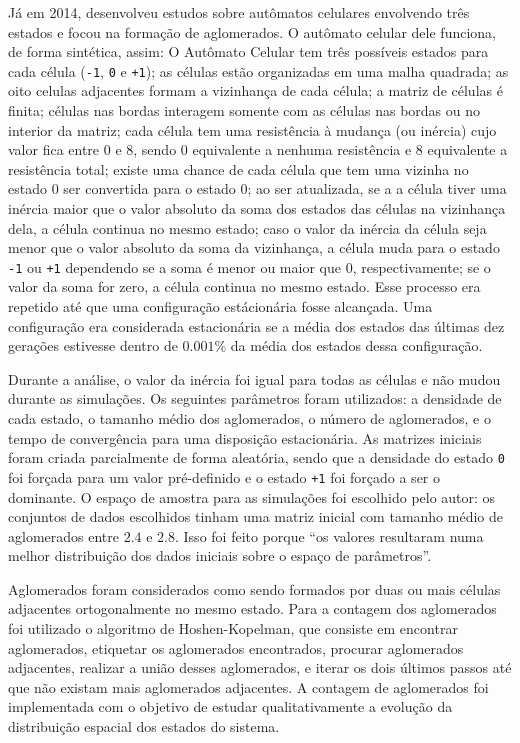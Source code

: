 \documentclass[
	12pt,				%
	openright,			%
	twoside,			%
	a4paper,			%
	english,			%
	french,				%
	spanish,			%
	brazil				%
	]{abntex2}
\begin{document}
Já em 2014,  desenvolveu estudos sobre autômatos celulares envolvendo três estados e focou na formação de aglomerados. O autômato celular dele funciona, de forma sintética, assim: O Autômato Celular tem três possíveis estados para cada célula (\texttt{-1}, \texttt{0} e \texttt{+1}); as células estão organizadas em uma malha quadrada; as oito celulas adjacentes formam a vizinhança de cada célula; a matriz de células é finita; células nas bordas interagem somente com as células nas bordas ou no interior da matriz; cada célula tem uma resistência à mudança (ou inércia) cujo valor fica entre $0$ e $8$, sendo $0$ equivalente a nenhuma resistência e $8$ equivalente a resistência total; existe uma chance de cada célula que tem uma vizinha no estado $0$ ser convertida para o estado $0$; ao ser atualizada, se a a célula tiver uma inércia maior que o valor absoluto da soma dos estados das células na vizinhança dela, a célula continua no mesmo estado; caso o valor da inércia da célula seja menor que o valor absoluto da soma da vizinhança, a célula muda para o estado \texttt{-1} ou \texttt{+1} dependendo se a soma é menor ou maior que $0$, respectivamente; se o valor da soma for zero, a célula continua no mesmo estado. Esse processo era repetido até que uma configuração estácionária fosse alcançada. Uma configuração era considerada estacionária se a média dos estados das últimas dez gerações estivesse dentro de $0.001\%$ da média dos estados dessa configuração.

Durante a análise, o valor da inércia foi igual para todas as células e não mudou durante as simulações. Os seguintes parâmetros foram utilizados: a densidade de cada estado, o tamanho médio dos aglomerados, o número de aglomerados, e o tempo de convergência para uma disposição estacionária. As matrizes iniciais foram criada parcialmente de forma aleatória, sendo que a densidade do estado \texttt{0} foi forçada para um valor pré-definido e o estado \texttt{+1} foi forçado a ser o dominante. O espaço de amostra para as simulações foi escolhido pelo autor: os conjuntos de dados escolhidos tinham uma matriz inicial com tamanho médio de aglomerados entre $2.4$ e $2.8$. Isso foi feito porque ``os valores resultaram numa melhor distribuição dos dados iniciais sobre o espaço de parâmetros''.

Aglomerados foram considerados como sendo formados por duas ou mais células adjacentes ortogonalmente no mesmo estado. 
Para a contagem dos aglomerados foi utilizado o algoritmo de Hoshen-Kopelman, que consiste em encontrar aglomerados, etiquetar os aglomerados encontrados, procurar aglomerados adjacentes, realizar a união desses aglomerados, e iterar os dois últimos passos até que não existam mais aglomerados adjacentes. A contagem de aglomerados foi implementada com o objetivo de estudar qualitativamente a evolução da distribuição espacial dos estados do sistema.
\end{document}
